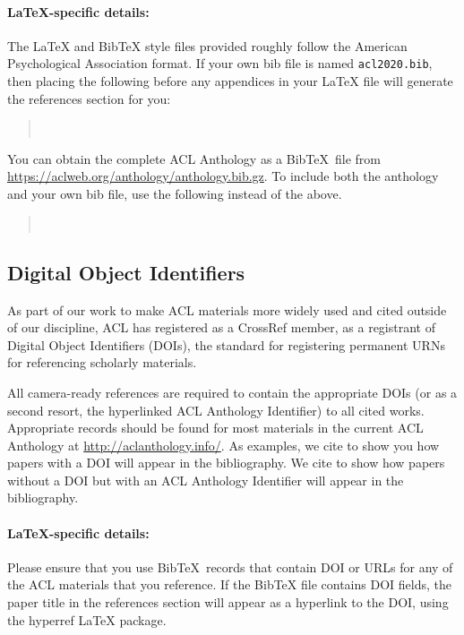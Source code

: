\documentclass[11pt,a4paper]{article}
\begin{document}
\paragraph{\LaTeX-specific details:}
The \LaTeX{} and Bib\TeX{} style files provided roughly follow the American Psychological Association format.
If your own bib file is named \texttt{\small acl2020.bib}, then placing the following before any appendices in your \LaTeX{}  file will generate the references section for you:
\begin{quote}\small
\verb||\\
\verb||
\end{quote}

You can obtain the complete ACL Anthology as a Bib\TeX\ file from \url{https://aclweb.org/anthology/anthology.bib.gz}.
To include both the anthology and your own bib file, use the following instead of the above.
\begin{quote}\small
\verb||\\
\verb||
\end{quote}


\subsection{Digital Object Identifiers}
As part of our work to make ACL materials more widely used and cited outside of our discipline, ACL has registered as a CrossRef member, as a registrant of Digital Object Identifiers (DOIs), the standard for registering permanent URNs for referencing scholarly materials.

All camera-ready references are required to contain the appropriate DOIs (or as a second resort, the hyperlinked ACL Anthology Identifier) to all cited works.
Appropriate records should be found for most materials in the current ACL Anthology at \url{http://aclanthology.info/}.
As examples, we cite \citep{goodman-etal-2016-noise} to show you how papers with a DOI will appear in the bibliography.
We cite \citep{harper-2014-learning} to show how papers without a DOI but with an ACL Anthology Identifier will appear in the bibliography.

\paragraph{\LaTeX-specific details:}
Please ensure that you use Bib\TeX\ records that contain DOI or URLs for any of the ACL materials that you reference.
If the Bib\TeX{} file contains DOI fields, the paper title in the references section will appear as a hyperlink to the DOI, using the hyperref \LaTeX{} package.
\end{document}
